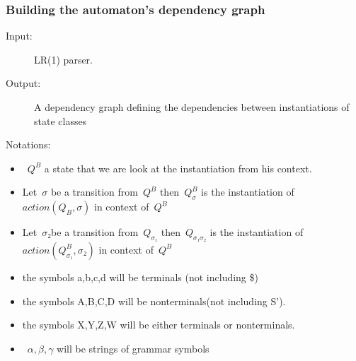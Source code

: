 \subsubsection{Building the automaton's dependency graph}

\begin{description}
  \item [Input:] LR(1) parser.
  \item [Output:] A dependency graph defining the dependencies between
  instantiations of state classes
  \item [Notations:]
\end{description}
\begin{itemize}
  \item~$Q^B$ a state that we are look at the instantiation from his context.
  \item Let~$σ$ be a transition from~$Q^B$ then~$Q_σ^B$
        is the instantiation of~$action(Q_B,σ)$ in context
        of~$Q^B$
  \item Let~$σ₂$be a transition from~$Q_{σ₁}$ then~$Q_{σ₁σ₂}$
        is the instantiation of~$action(Q_{σ₁}^B,σ₂)$
        in context of~$Q^B$
  \item the symbols a,b,c,d will be terminals (not including \$)
  \item the symbols A,B,C,D will be nonterminals(not including S').
  \item the symbols X,Y,Z,W will be either terminals or nonterminals.
        \item~$α,β,γ$ will be strings of grammar symbols
\end{itemize}
